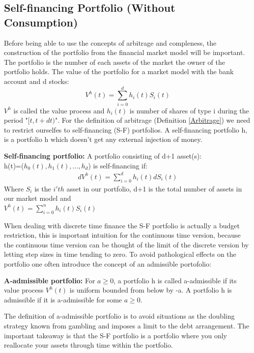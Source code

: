 \subsection{Self-financing Portfolio (Without Consumption)}
Before being able to use the concepts of arbitrage and compleness, the construction of the portfolio from the financial market model will be important. The portfolio is the number of each assets of the market the owner of the portfolio holds. The value of the portfolio for a market model with the bank account and d stocks:
\begin{equation}
V^h(t)=\sum_{i=0}^{d} h_{i}(t) S_i(t)
\end{equation}
$V^h$ is called the value process and $h_i(t)$ is number of shares of type i during the period "$[t,t+dt)$". For the definition of arbitrage (Definition \ref{Arbitrage}) we need to restrict ourselfes to self-financing (S-F) portfolios. A self-financing portfolio h, is a portfolio h which doesn't get any external injection of money.
\theoremstyle{definition}
\begin{definition}{\textbf{Self-financing portfolio: }}
A portfolio consisting of d+1 asset(s): \\
h(t)=($h_0(t),h_1(t), \dotsc, h_{d}$) is self-financing if:
\begin{equation}\label{SF}
\begin{split}
dV^{h}(t)=\sum_{i=0}^{d} h_{i}(t) dS_{i}(t)
\end{split}
\end{equation}
Where $S_{i}$ is the $i'th$ asset in our portfolio, d+1 is the total number of assets in our market model and\\
$V^{h}(t)=\sum_{i=0}^{n} h_{i}(t) S_{i}(t)$\\
\end{definition}
When dealing with discrete time finance the S-F portfolio is actually a budget restriction, this is important intuition for the continuous time version, because the continuous time version can be thought of the limit of the discrete version by letting step sizes in time tending to zero. To avoid pathological effects on the portfolio one often introduce the concept of an admissible portofolio:
\theoremstyle{definition}
\begin{definition}{\textbf{A-admissible portfolio: }}
For $a\geq 0$, a portfolio h is called a-admissible if its value process $V^h(t)$ is uniform bounded from below by -a. A portfolio h is admissible if it is a-admissible for some $a\geq 0$.
\end{definition}
The definition of a-admissible portfolio is to avoid situations as the doubling strategy known from gambling and imposes a limit to the debt arrangement. The important takeaway is that the S-F portfolio is a portfolio where you only reallocate your assets through time within the portfolio.

